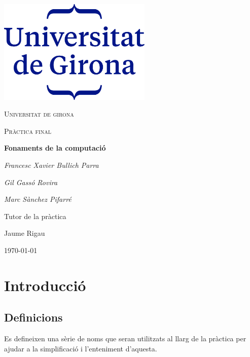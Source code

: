 \documentclass[12pt,a4paper]{report}
\begin{document}
\begin{titlepage}
	\centering
	\includegraphics[width=0.55\textwidth]{udg_logo.png}\par\vspace{1cm}
	{\scshape\LARGE Universitat de girona \par}
	\vspace{1cm}
	{\scshape\Large Pràctica final\par}
	\vspace{1.5cm}
	{\huge\bfseries Fonaments de la computació\par}
	\vspace{2cm}
	{\Large\itshape Francesc Xavier Bullich Parra\par}
	{\Large\itshape Gil Gassó Rovira\par}
	{\Large\itshape Marc Sànchez Pifarré\par}

	\vfill
	Tutor de la pràctica\par
	Jaume Rigau

	\vfill

	{\large \today\par}
\end{titlepage}

\tableofcontents
\clearpage


\chapter{Introducció}
\setcounter{chapter}{1}

\section{Definicions}

Es defineixen una sèrie de noms que seran utilitzats al llarg de la pràctica per ajudar a la simplificació i l'enteniment d'aquesta.
\end{document}

